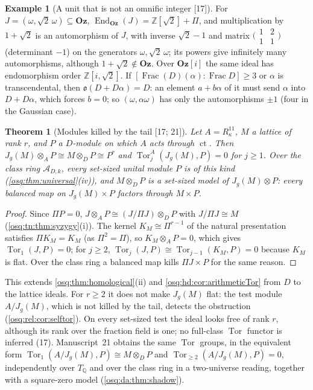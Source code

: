 \documentclass[11pt,letterpaper]{article}
\numberwithin{equation}{section}
\newtheorem{theorem}{Theorem}[section]
\theoremstyle{definition}
\newtheorem{example}[example]{Example}
\theoremstyle{remark}
\theoremstyle{plain}
\newcommand{\Oz}{\mathbf{Oz}}
\newcommand{\GOz}{\Oz[i]}
\newcommand{\Z}{\mathbb Z}
\newcommand{\Q}{\mathbb Q}
\newcommand{\A}{\mathcal A}          %
\newcommand{\ct}{\operatorname{ct}}
\newcommand{\End}{\operatorname{End}}
\newcommand{\Frac}{\operatorname{Frac}}
\newcommand{\Tor}{\operatorname{Tor}}
\newcommand{\src}[1]{\textup{\textsf{[#1]}}}
\begin{document}
\begin{example}[A unit that is not an omnific integer \src{17}]\label{osq:rel:ex:pell}
For $J=(\omega,\sqrt2\,\omega)\subseteq\Oz$, $\End_{\Oz}(J)=\Z[\sqrt2]+\Pi$, and multiplication by $1+\sqrt2$ is an automorphism of $J$,
with inverse $\sqrt2-1$ and matrix $\bigl(\begin{smallmatrix}1&2\\1&1\end{smallmatrix}\bigr)$ (determinant $-1$) on the generators
$\omega,\sqrt2\,\omega$; its powers give infinitely many automorphisms, although $1+\sqrt2\notin\Oz$. Over $\GOz$ the same ideal has
endomorphism order $\Z[i,\sqrt2]$. If $[\Frac(D)(\alpha):\Frac D]\ge3$ or $\alpha$ is transcendental, then
$\mathfrak o(D+D\alpha)=D$: an element $a+b\alpha$ of it must send $\alpha$ into $D+D\alpha$, which forces $b=0$; so
$(\omega,\alpha\omega)$ has only the automorphisms $\pm1$ (four in the Gaussian case).
\end{example}

\begin{theorem}[Modules killed by the tail \src{17; 21}]\label{osq:rel:thm:augmentation}
Let $A=R^{11}_\kappa$, $M$ a lattice of rank $r$, and $P$ a $D$-module on which $A$ acts through $\ct$. Then
$J_g(M)\otimes_AP\cong M\otimes_DP\cong P^r$ and $\Tor^A_j(J_g(M),P)=0$ for $j\ge1$. Over the class ring $\A_{D,k}$, every set-sized
unital module $P$ is of this kind (\cref{osq:thm:universal}(iv)), and $M\otimes_DP$ is a set-sized model of $J_g(M)\otimes P$: every
balanced map on $J_g(M)\times P$ factors through $M\times P$.
\end{theorem}
\begin{proof}
Since $\Pi P=0$, $J\otimes_AP\cong(J/\Pi J)\otimes_DP$ with $J/\Pi J\cong M$ (\cref{osq:tn:thm:syzygy}(i)). The kernel
$K_M\cong\Pi^{r-1}$ of the natural presentation satisfies $\Pi K_M=K_M$ (as $\Pi^2=\Pi$), so $K_M\otimes_AP=0$, which gives
$\Tor_1(J,P)=0$; for $j\ge2$, $\Tor_j(J,P)\cong\Tor_{j-1}(K_M,P)=0$ because $K_M$ is flat. Over the class ring a balanced map kills
$\Pi J\times P$ for the same reason.
\end{proof}

This extends \cref{osq:thm:homological}(ii) and \cref{osq:hd:cor:arithmeticTor} from $D$ to the lattice ideals. For $r\ge2$ it does
not make $J_g(M)$ flat: the test module $A/J_g(M)$, which is not killed by the tail, detects the obstruction
(\cref{osq:rel:cor:selftor}). On every set-sized test the ideal looks free of rank $r$, although its rank over the fraction field is one;
no full-class $\Tor$ functor is inferred (17). Manuscript~21 obtains the same $\Tor$ groups, in the equivalent form
$\Tor_1(A/J_g(M),P)\cong M\otimes_DP$ and $\Tor_{\ge2}(A/J_g(M),P)=0$, independently over $T_\Q$ and over the class ring in a
two-universe reading, together with a square-zero model (\cref{osq:da:thm:shadow}).
\end{document}
